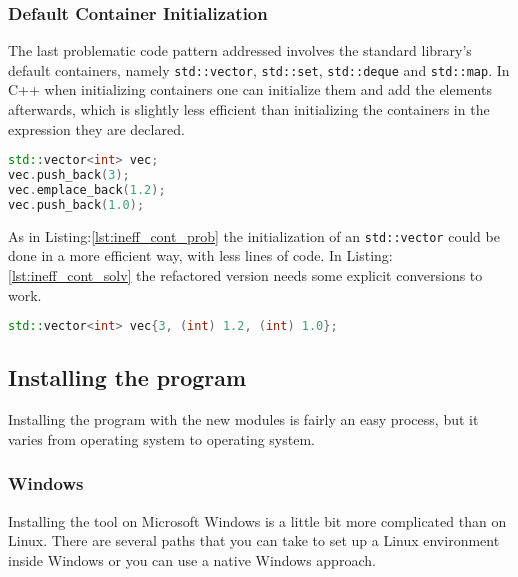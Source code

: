 \subsubsection{Default Container Initialization}
\par The last problematic code pattern addressed involves the standard library's default containers, namely \verb|std::vector|, \verb|std::set|, \verb|std::deque| and \verb|std::map|. In C++ when initializing containers one can initialize them and add the elements afterwards, which is slightly less efficient than initializing the containers in the expression they are declared. \medskip
\begin{lstlisting}[language=c++, frame=single ,caption={Inefficient way of creating containers}, label={lst:ineff_cont_prob}]
std::vector<int> vec;
vec.push_back(3);
vec.emplace_back(1.2);
vec.push_back(1.0);
\end{lstlisting}
\par As in Listing:\ref{lst:ineff_cont_prob} the initialization of an \verb|std::vector| could be done in a more efficient way, with less lines of code. In Listing:\ref{lst:ineff_cont_solv}  the refactored version needs some explicit conversions to work. 
\begin{lstlisting}[language=c++, frame=single ,caption={A faster way of initializing}, label={lst:ineff_cont_solv}]
std::vector<int> vec{3, (int) 1.2, (int) 1.0};
\end{lstlisting}
\subsection{Installing the program}
Installing the program with the new modules is fairly an easy process, but it varies from operating system to operating system.
\subsubsection{Windows}
\par Installing the tool on Microsoft Windows is a little bit more complicated than on Linux. There are several paths that you can take to set up a Linux environment inside Windows or you can use a native Windows approach. 
